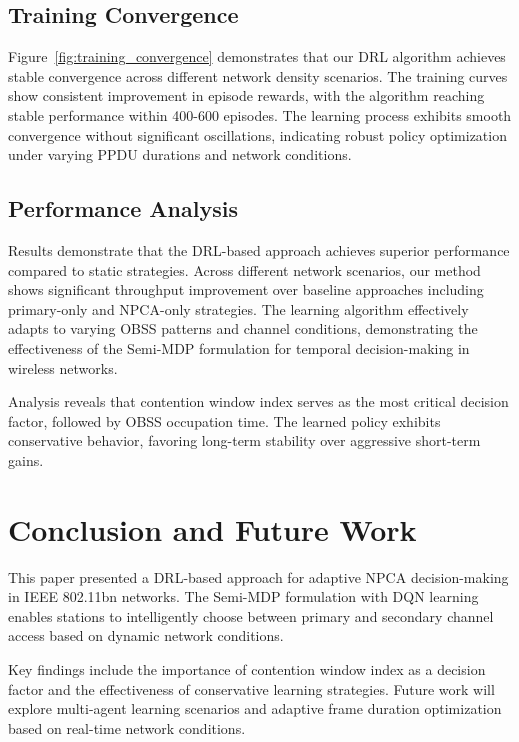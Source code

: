 \documentclass[conference]{IEEEtran}
\begin{document}
\subsection{Training Convergence}

Figure~\ref{fig:training_convergence} demonstrates that our DRL algorithm achieves stable convergence across different network density scenarios. The training curves show consistent improvement in episode rewards, with the algorithm reaching stable performance within 400-600 episodes. The learning process exhibits smooth convergence without significant oscillations, indicating robust policy optimization under varying PPDU durations and network conditions.

\subsection{Performance Analysis}

Results demonstrate that the DRL-based approach achieves superior performance compared to static strategies. Across different network scenarios, our method shows significant throughput improvement over baseline approaches including primary-only and NPCA-only strategies. The learning algorithm effectively adapts to varying OBSS patterns and channel conditions, demonstrating the effectiveness of the Semi-MDP formulation for temporal decision-making in wireless networks.

Analysis reveals that contention window index serves as the most critical decision factor, followed by OBSS occupation time. The learned policy exhibits conservative behavior, favoring long-term stability over aggressive short-term gains.

\section{Conclusion and Future Work}

This paper presented a DRL-based approach for adaptive NPCA decision-making in IEEE 802.11bn networks. The Semi-MDP formulation with DQN learning enables stations to intelligently choose between primary and secondary channel access based on dynamic network conditions.

Key findings include the importance of contention window index as a decision factor and the effectiveness of conservative learning strategies. Future work will explore multi-agent learning scenarios and adaptive frame duration optimization based on real-time network conditions.
\end{document}
